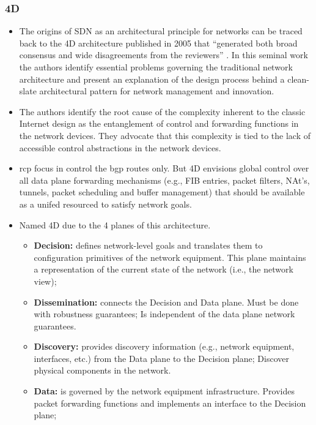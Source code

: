 \subsubsection{4D}
\begin{itemize}
\item  The origins of SDN as an architectural principle for networks can be traced back to the 4D architecture published in  2005 that ``generated both broad consensus and wide disagreements from
the reviewers''  \cite{Greenberg:2005boa}. In this seminal work the authors identify essential
problems governing  the traditional network architecture and  present an
explanation of the design process behind a clean-slate architectural
pattern for network management and innovation.  


\item The authors identify  the root cause of the complexity inherent to the
classic Internet design as the  entanglement  of control and
forwarding functions in the network devices. They advocate that this complexity is tied to the lack of accessible control abstractions in the network devices. 

\item\gls{rcp} focus in control the \gls{bgp} routes only. But 4D envisions global control over all data plane forwarding mechanisms (e.g., FIB entries, packet filters, NAt's, tunnels, packet scheduling and buffer management) that should be available as a unifed  resourced to satisfy network goals. 

\item Named 4D due to the 4 planes of this architecture. 

\begin{itemize}
\item[] \textbf{Decision:}  defines network-level goals and 
  translates them to configuration primitives of the network
  equipment. This plane maintains a representation of the current state of the network (i.e., the network view); 
\item[] \textbf{Dissemination:}  connects the Decision and Data plane. Must be
  done with robustness guarantees; Is independent of the data plane network guarantees. 
\item[] \textbf{Discovery:} provides discovery information (e.g., network
  equipment, interfaces, etc.) from the Data plane to the Decision plane; Discover physical components in the network. 
\item[] \textbf{Data:}  is governed by the network equipment
  infrastructure. Provides packet forwarding functions and implements
  an interface to the Decision plane;  
\end{itemize}


\end{itemize}
